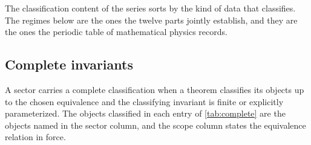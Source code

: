\documentclass[11pt,letterpaper]{article}
\theoremstyle{definition}
\theoremstyle{remark}
\begin{document}
The classification content of the series sorts by the kind of data that classifies. The regimes below are the ones the twelve parts jointly establish, and they are the ones the periodic table of mathematical physics records.

\subsection{Complete invariants}

A sector carries a complete classification when a theorem classifies its objects up to the chosen equivalence and the classifying invariant is finite or explicitly parameterized. The objects classified in each entry of \cref{tab:complete} are the objects named in the sector column, and the scope column states the equivalence relation in force.
\end{document}
